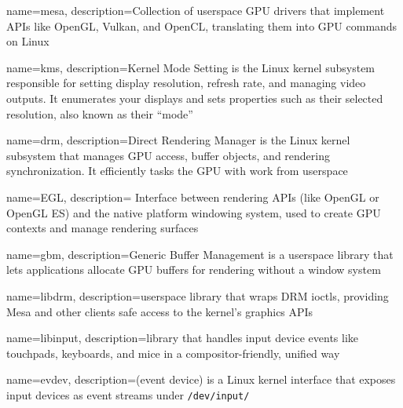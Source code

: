  {
	name=mesa,
	description={Collection of userspace GPU drivers that implement APIs like OpenGL, Vulkan, and OpenCL, translating them into GPU commands on Linux}
}


 {
	name=kms,
	description={Kernel Mode Setting is the Linux kernel subsystem responsible
			for setting display resolution, refresh rate, and managing video
			outputs. It enumerates your displays and sets properties such as their
			selected resolution, also known as their ``mode''
		}
}

 {
	name=drm,
	description={Direct Rendering Manager is the Linux kernel subsystem that
			manages GPU access, buffer objects, and rendering synchronization. It
			efficiently tasks the GPU with work from userspace
		}
}

 {
	name=EGL,
	description={
			Interface between rendering APIs (like OpenGL or OpenGL ES) and the
			native platform windowing system, used to create GPU contexts and
			manage rendering surfaces
		}
}


 {
	name=gbm,
	description={Generic Buffer Management is a userspace library that lets
			applications allocate GPU buffers for rendering without a window system}
}

 {
	name=libdrm,
	description={userspace library that wraps DRM ioctls, providing
			Mesa and other clients safe access to the kernel’s graphics APIs}
}

 {
	name=libinput,
	description={library that handles input device events like
			touchpads, keyboards, and mice in a compositor-friendly, unified way}
}

 {
	name=evdev,
	description={(event device) is a Linux kernel interface that exposes
			input devices as event streams under \texttt{/dev/input/}}
}
